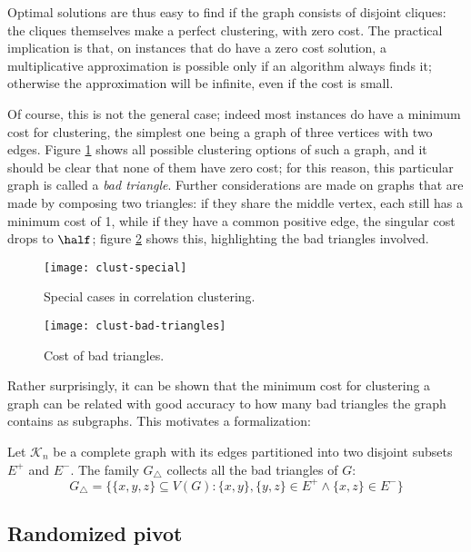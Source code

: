 Optimal solutions are thus easy to find if the graph consists of disjoint cliques: the cliques themselves make a perfect clustering, with zero cost. The practical implication is that, on instances that do have a zero cost solution, a multiplicative approximation is possible only if an algorithm always finds it; otherwise the approximation will be infinite, even if the cost is small.

Of course, this is not the general case; indeed most instances do have a minimum cost for clustering, the simplest one being a graph of three vertices with two edges. Figure \ref{fig:clust-special} shows all possible clustering options of such a graph, and it should be clear that none of them have zero cost; for this reason, this particular graph is called a \emph{bad triangle}. Further considerations are made on graphs that are made by composing two triangles: if they share the middle vertex, each still has a minimum cost of 1, while if they have a common positive edge, the singular cost drops to $\half$; figure \ref{fig:clust-bad-triangles} shows this, highlighting the bad triangles involved.

\begin{figure}
    \centering
    \texttt{[image: clust-special]}
    \caption{Special cases in correlation clustering.}
    \label{fig:clust-special}
\end{figure}

\begin{figure}
    \centering
    \texttt{[image: clust-bad-triangles]}
    \caption{Cost of bad triangles.}
    \label{fig:clust-bad-triangles}
\end{figure}

Rather surprisingly, it can be shown that the minimum cost for clustering a graph can be related with good accuracy to how many bad triangles the graph contains as subgraphs. This motivates a formalization:

\begin{definition}
    Let $\mathcal{K}_n$ be a complete graph with its edges partitioned into two disjoint subsets $E^+$ and $E^-$. The family $G_\triangle$ collects all the bad triangles of $G$:
    \[
        G_\triangle = \{ \{x, y, z\} \subseteq V(G) : \{x, y\}, \{y, z\} \in E^+ \wedge \{x, z\} \in E^-\}
    \]
\end{definition}


\subsection{Randomized pivot}\label{sec:random-pivot}

